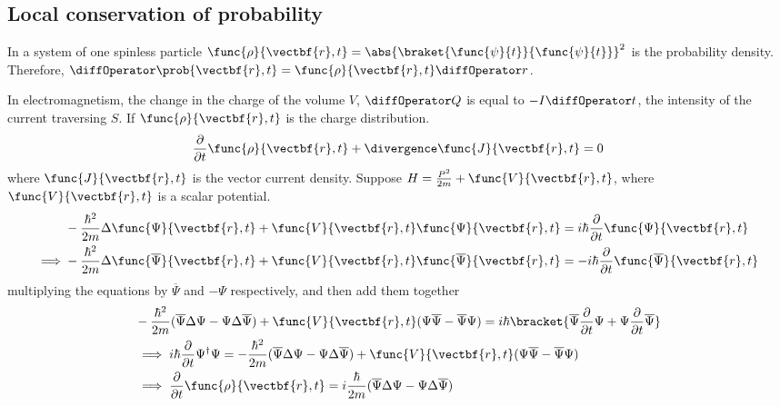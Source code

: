 \subsection{Local conservation of probability}
In a system of one spinless particle \(\func{\rho}{\vectbf{r},t} = \abs{\braket{\func{\psi}{t}}{\func{\psi}{t}}}^2\) is the probability density. Therefore, \(\diffOperator \prob{\vectbf{r},t} = \func{\rho}{\vectbf{r},t}\diffOperator r\).

In electromagnetism, the change in the charge of the volume \(V\), \(\diffOperator Q\) is equal to \(-I \diffOperator t\), the intensity of the current traversing \(S\). If \(\func{\rho}{\vectbf{r},t}\) is the charge distribution.
\begin{equation*}
    \dfrac{\partial}{\partial t} \func{\rho}{\vectbf{r},t} + \divergence \func{J}{\vectbf{r},t} = 0
\end{equation*}
where \(\func{J}{\vectbf{r},t}\) is the vector current density. Suppose \(H = \frac{P^2}{2m} + \func{V}{\vectbf{r},t}\), where \(\func{V}{\vectbf{r},t}\) is a scalar potential.
\begin{align*}
             & -\frac{\hbar^2}{2m} \Delta \func{\Psi}{\vectbf{r},t} + \func{V}{\vectbf{r},t} \func{\Psi}{\vectbf{r},t} = i \hbar \frac{\partial }{\partial t} \func{\Psi}{\vectbf{r},t}                                   \\
    \implies & -\frac{\hbar^2}{2m} \Delta \func{\overline{\Psi}}{\vectbf{r},t} + \func{V}{\vectbf{r},t} \func{\overline{\Psi}}{\vectbf{r},t} = -i \hbar \frac{\partial }{\partial t} \func{\overline{\Psi}}{\vectbf{r},t} \\
\end{align*}
multiplying the equations by \(\overline{\Psi}\) and \(-\Psi\) respectively, and then add them together
\begin{align*}
     & -\frac{\hbar^2}{2m} (\overline{\Psi}\Delta \Psi - \Psi \Delta \overline{\Psi}) + \func{V}{\vectbf{r},t} (\Psi \overline{\Psi} - \overline{\Psi} \Psi) = i\hbar \bracket{\overline{\Psi} \frac{\partial }{\partial t} \Psi + \Psi \frac{\partial }{\partial t} \overline{\Psi}} \\
     & \implies i \hbar \frac{\partial }{\partial t} \Psi^{\dagger } \Psi = -\frac{\hbar^2}{2m} (\overline{\Psi}\Delta \Psi - \Psi \Delta \overline{\Psi}) + \func{V}{\vectbf{r},t} (\Psi \overline{\Psi} - \overline{\Psi} \Psi)                                                     \\
     & \implies \frac{\partial }{\partial t} \func{\rho}{\vectbf{r},t} = i \frac{\hbar}{2m} (\overline{\Psi}\Delta \Psi - \Psi \Delta \overline{\Psi})
\end{align*}
